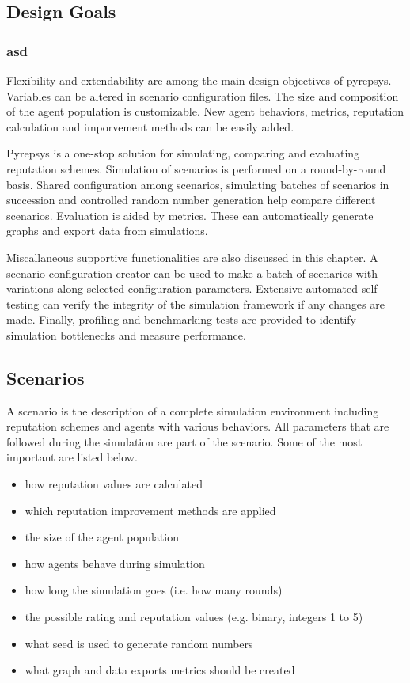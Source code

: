 \documentclass[%
    ]{\PathToTumTemplate/thesis/tum_thesis}
\begin{document}
\subsection{Design Goals}
\subsubsection{asd}
Flexibility and extendability are among the main design objectives of pyrepsys.
Variables can be altered in scenario configuration files.
The size and composition of the agent population is customizable.
New agent behaviors, metrics, reputation calculation and imporvement methods can be easily added.





Pyrepsys is a one-stop solution for simulating, comparing and evaluating reputation schemes.
Simulation of scenarios is performed on a round-by-round basis.
Shared configuration among scenarios, simulating batches of scenarios in succession and controlled random number generation help compare different scenarios.
Evaluation is aided by metrics.
These can automatically generate graphs and export data from simulations.



Miscallaneous supportive functionalities are also discussed in this chapter.
A scenario configuration creator can be used to make a batch of scenarios with variations along selected configuration parameters.
Extensive automated self-testing can verify the integrity of the simulation framework if any changes are made.
Finally, profiling and benchmarking tests are provided to identify simulation bottlenecks and measure performance.


\subsection{Scenarios}\label{sec:scenario}
A \gls{scenario} is the description of a complete simulation environment including reputation schemes and agents with various behaviors.
All parameters that are followed during the simulation are part of the scenario.
Some of the most important are listed below.

\begin{itemize}
	\item how reputation values are calculated
	\item which reputation improvement methods are applied
	\item the size of the agent population
	\item how agents behave during simulation
	\item how long the simulation goes (i.e. how many rounds)
	\item the possible rating and reputation values (e.g. binary, integers 1 to 5)
	\item what seed is used to generate random numbers
	\item what graph and data exports metrics should be created
\end{itemize}
\end{document}

